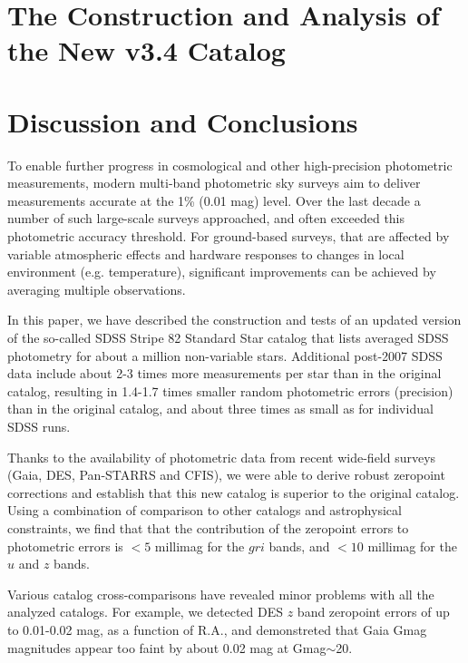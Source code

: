 \documentclass{aastex63}
\begin{document}
 
\section{The Construction and Analysis of the New v3.4 Catalog \label{sec:v34}}

\section{Discussion and Conclusions} \label{sec:disc}

To enable further progress in cosmological and other high-precision photometric measurements, 
modern multi-band photometric sky surveys aim to deliver measurements accurate at the 1\% 
(0.01 mag) level. Over the last decade a number of such large-scale surveys approached, and
often exceeded this photometric accuracy threshold. For ground-based surveys, that are 
affected by variable atmospheric effects and hardware responses to changes in local environment
(e.g. temperature), significant improvements can be achieved by averaging multiple observations. 

In this paper, we have described the construction and tests of an updated version of the so-called
SDSS Stripe 82 Standard Star catalog \citep{Ivez07} that lists averaged SDSS photometry for about
a million non-variable stars. Additional post-2007 SDSS data include about 
2-3 times more measurements per star than in the original catalog, resulting in 1.4-1.7 times smaller 
random photometric errors (precision) than in the original catalog, and about three times as small 
as for individual SDSS runs.

Thanks to the availability of photometric data from recent wide-field surveys (Gaia, DES, Pan-STARRS
and CFIS), we were able to derive robust zeropoint corrections and establish that this new catalog
is superior to the original catalog. Using a combination of comparison to other catalogs and 
astrophysical constraints, we find that that the contribution of the zeropoint errors to photometric
errors is $<5$ millimag for the $gri$ bands, and $<10$ millimag for the $u$ and $z$ bands. 

Various catalog cross-comparisons have revealed minor problems with all the analyzed catalogs.
For example, we detected DES $z$ band zeropoint errors of up to 0.01-0.02 mag, as a function 
of R.A., and demonstreted that Gaia Gmag magnitudes appear too faint by about 0.02 mag at
Gmag$\sim$20.
 
\end{document}
